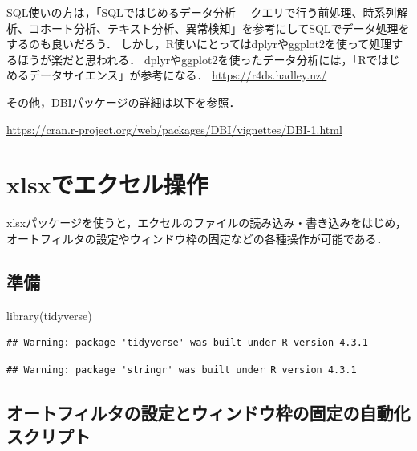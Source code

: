 \documentclass[
]{article}
\newenvironment{Shaded}{\begin{snugshade}}{\end{snugshade}}
\newcommand{\FunctionTok}[1]{\textcolor[rgb]{0.00,0.00,0.00}{#1}}
\newcommand{\NormalTok}[1]{#1}
\begin{document}
SQL使いの方は，「SQLではじめるデータ分析 ―クエリで行う前処理、時系列解析、コホート分析、テキスト分析、異常検知」を参考にしてSQLでデータ処理をするのも良いだろう．
しかし，R使いにとってはdplyrやggplot2を使って処理するほうが楽だと思われる．
dplyrやggplot2を使ったデータ分析には，「Rではじめるデータサイエンス」が参考になる．
\url{https://r4ds.hadley.nz/}

その他，DBIパッケージの詳細は以下を参照．

\url{https://cran.r-project.org/web/packages/DBI/vignettes/DBI-1.html}

\hypertarget{xlsx}{%
\section{xlsxでエクセル操作}\label{xlsx}}

xlsxパッケージを使うと，エクセルのファイルの読み込み・書き込みをはじめ，
オートフィルタの設定やウィンドウ枠の固定などの各種操作が可能である．

\hypertarget{ux6e96ux5099-14}{%
\subsection{準備}\label{ux6e96ux5099-14}}

\begin{Shaded}
\begin{Highlighting}[]
\FunctionTok{library}\NormalTok{(tidyverse)}
\end{Highlighting}
\end{Shaded}

\begin{verbatim}
## Warning: package 'tidyverse' was built under R version 4.3.1
\end{verbatim}

\begin{verbatim}
## Warning: package 'stringr' was built under R version 4.3.1
\end{verbatim}

\hypertarget{ux30aaux30fcux30c8ux30d5ux30a3ux30ebux30bfux306eux8a2dux5b9aux3068ux30a6ux30a3ux30f3ux30c9ux30a6ux67a0ux306eux56faux5b9aux306eux81eaux52d5ux5316ux30b9ux30afux30eaux30d7ux30c8}{%
\subsection{オートフィルタの設定とウィンドウ枠の固定の自動化スクリプト}\label{ux30aaux30fcux30c8ux30d5ux30a3ux30ebux30bfux306eux8a2dux5b9aux3068ux30a6ux30a3ux30f3ux30c9ux30a6ux67a0ux306eux56faux5b9aux306eux81eaux52d5ux5316ux30b9ux30afux30eaux30d7ux30c8}}
\end{document}
